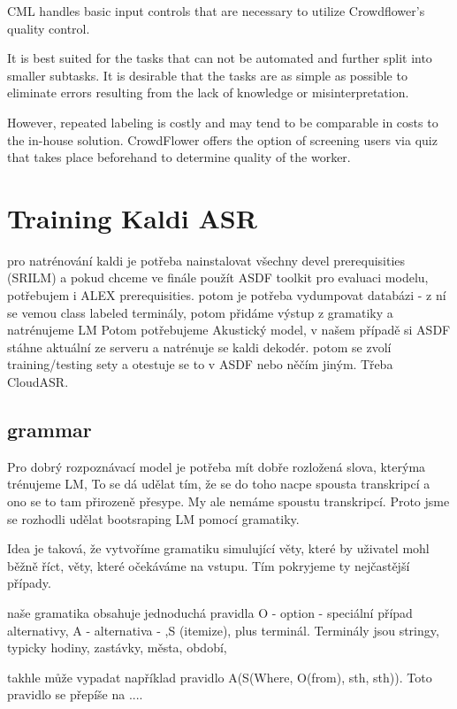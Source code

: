 CML handles basic input controls that are necessary to utilize Crowdflower's quality control. %

It is best suited for the tasks that can not be automated and further split into smaller subtasks.
It is desirable that the tasks are as simple as possible to eliminate errors resulting from the lack of knowledge or misinterpretation.

However, repeated labeling is costly and may tend to be comparable in costs to the in-house solution.
CrowdFlower offers the option of screening users via quiz that takes place beforehand to determine quality of the worker.


\section{Training Kaldi ASR}

pro natrénování kaldi je potřeba nainstalovat všechny devel prerequisities (SRILM) a pokud chceme ve finále použít ASDF toolkit pro evaluaci modelu, potřebujem i ALEX prerequisities. potom je potřeba vydumpovat databázi - z ní se vemou class labeled terminály, potom přidáme výstup z gramatiky a natrénujeme LM Potom potřebujeme Akustický model, v našem případě si ASDF stáhne aktuální ze serveru a natrénuje se kaldi dekodér. potom se zvolí training/testing sety a otestuje se to v ASDF nebo něčím jiným. Třeba CloudASR.

\subsection{grammar}

Pro dobrý rozpoznávací model je potřeba mít dobře rozložená slova, kterýma trénujeme LM, To se dá udělat tím, že se do toho nacpe spousta transkripcí a ono se to tam přirozeně přesype. My ale nemáme spoustu transkripcí. Proto jsme se rozhodli udělat bootsraping LM pomocí gramatiky.

Idea je taková, že vytvoříme gramatiku simulující věty, které by uživatel mohl běžně říct, věty, které očekáváme na vstupu. Tím pokryjeme ty nejčastější případy.

naše gramatika obsahuje jednoduchá pravidla O - option - speciální případ alternativy, A - alternativa - ,S (itemize), plus terminál.
Terminály jsou stringy, typicky hodiny, zastávky, města, období, 

takhle může vypadat například pravidlo A(S(Where, O(from), sth, sth)). 
Toto pravidlo se přepíše na .... 

